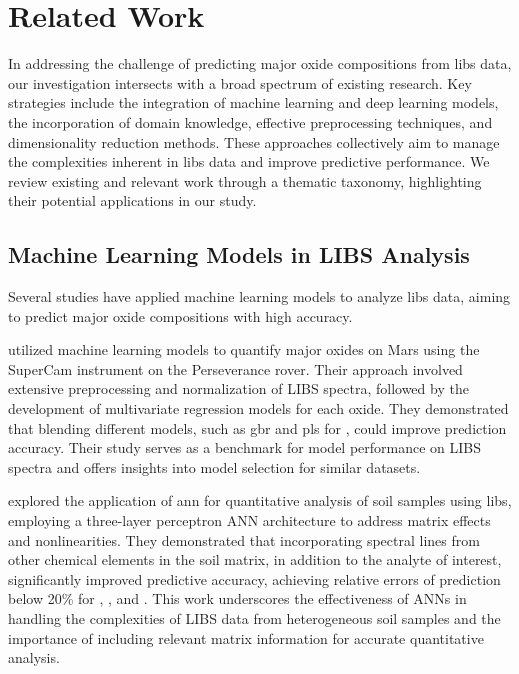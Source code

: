 \section{Related Work}\label{sec:related-work}
In addressing the challenge of predicting major oxide compositions from \gls{libs} data, our investigation intersects with a broad spectrum of existing research.
Key strategies include the integration of machine learning and deep learning models, the incorporation of domain knowledge, effective preprocessing techniques, and dimensionality reduction methods.
These approaches collectively aim to manage the complexities inherent in \gls{libs} data and improve predictive performance.
We review existing and relevant work through a thematic taxonomy, highlighting their potential applications in our study.

\subsection{Machine Learning Models in LIBS Analysis}
Several studies have applied machine learning models to analyze \gls{libs} data, aiming to predict major oxide compositions with high accuracy.

\citet{andersonPostlandingMajorElement2022} utilized machine learning models to quantify major oxides on Mars using the SuperCam instrument on the Perseverance rover.
Their approach involved extensive preprocessing and normalization of LIBS spectra, followed by the development of multivariate regression models for each oxide.
They demonstrated that blending different models, such as \gls{gbr} and \gls{pls} for , could improve prediction accuracy.
Their study serves as a benchmark for model performance on LIBS spectra and offers insights into model selection for similar datasets.

\citet{el_haddad_ann_2013} explored the application of \gls{ann} for quantitative analysis of soil samples using \gls{libs}, employing a three-layer perceptron ANN architecture to address matrix effects and nonlinearities.
They demonstrated that incorporating spectral lines from other chemical elements in the soil matrix, in addition to the analyte of interest, significantly improved predictive accuracy, achieving relative errors of prediction below 20\% for , ,  and .
This work underscores the effectiveness of ANNs in handling the complexities of LIBS data from heterogeneous soil samples and the importance of including relevant matrix information for accurate quantitative analysis.

